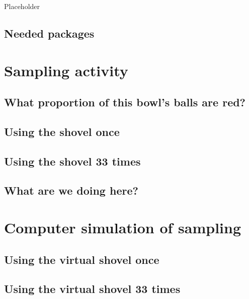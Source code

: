 \documentclass[12pt, krantz2,]{krantz}
\begin{document}
Placeholder

\hypertarget{needed-packages-5}{%
\subsection*{Needed packages}\label{needed-packages-5}}


\hypertarget{sampling-activity}{%
\section{Sampling activity}\label{sampling-activity}}

\hypertarget{what-proportion-of-this-bowls-balls-are-red}{%
\subsection{What proportion of this bowl's balls are red?}\label{what-proportion-of-this-bowls-balls-are-red}}

\hypertarget{using-the-shovel-once}{%
\subsection{Using the shovel once}\label{using-the-shovel-once}}

\hypertarget{student-shovels}{%
\subsection{Using the shovel 33 times}\label{student-shovels}}

\hypertarget{what-are-we-doing-here}{%
\subsection{What are we doing here?}\label{what-are-we-doing-here}}

\hypertarget{sampling-simulation}{%
\section{Computer simulation of sampling}\label{sampling-simulation}}

\hypertarget{using-the-virtual-shovel-once}{%
\subsection{Using the virtual shovel once}\label{using-the-virtual-shovel-once}}

\hypertarget{using-the-virtual-shovel-33-times}{%
\subsection{Using the virtual shovel 33 times}\label{using-the-virtual-shovel-33-times}}
\end{document}
